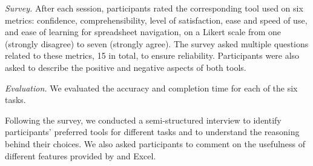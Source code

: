 \emph{Survey.} After each session, 
participants rated the corresponding tool used on six metrics: 
confidence, comprehensibility, level of satisfaction, 
ease and speed of use, and ease of learning for spreadsheet navigation, 
on a Likert scale from one (\eg strongly disagree) to seven (\eg strongly agree). 
The survey asked multiple questions related to these metrics, 
15 in total, to ensure reliability. 
Participants were also asked to describe the positive 
and negative aspects of both tools. 

\emph{Evaluation.} 
We evaluated the accuracy and
completion time for each of the six tasks. 

Following the survey, we conducted a semi-structured interview to 
identify participants’ preferred tools for different tasks 
and to understand the reasoning behind their choices. 
We also asked participants to comment on the usefulness of 
different features provided by \noah and Excel. 


